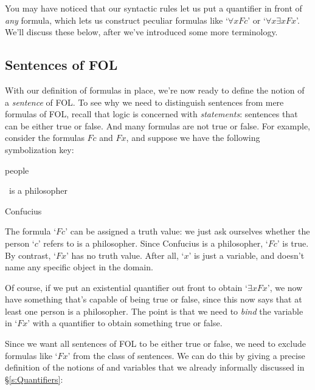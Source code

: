 \noindent You may have noticed that our syntactic rules let us put a quantifier in front of \emph{any} formula, which lets us construct peculiar formulas like `$\forall x Fc$' or `$\forall x\exists xFx$'.  We'll discuss these below, after we've introduced some more terminology.



\subsection{Sentences of FOL}\label{s:FOLSentences}
With our definition of formulas in place, we're now ready to define the notion of a \emph{sentence} of FOL.  To see why we need to distinguish sentences from mere formulas of FOL, recall that logic is concerned with \emph{statements}: sentences  that can be either true or false. And many formulas are not true or false.  For example, consider the formulas $Fc$ and $Fx$, and suppose we have the following symbolization key:
	\begin{ekey}
		\item[\text{domain}] people
		\item[F] \blank \ is a philosopher
		\item[c] Confucius
	\end{ekey}
The formula `$Fc$' can be assigned a truth value: we just ask ourselves whether the person `$c$' refers to is a philosopher.  Since Confucius is a philosopher, `$Fc$' is true.  By contrast, `$Fx$' has no truth value.  After all, `$x$' is just a variable, and doesn't name any specific object in the domain.

Of course, if we put an existential quantifier out front to obtain `$\exists xFx$', we now have something that's capable of being true or false, since this now says that at least one person is a philosopher.  The point is that we need to \emph{bind} the variable in `$Fx$' with a quantifier to obtain something true or false.

Since we want all sentences of FOL to be either true or false, we need to exclude formulas like `$Fx$' from the class of sentences.  We can do this by giving a precise definition of the notions of  and  variables that we already informally discussed in \S \ref{s:Quantifiers}:


